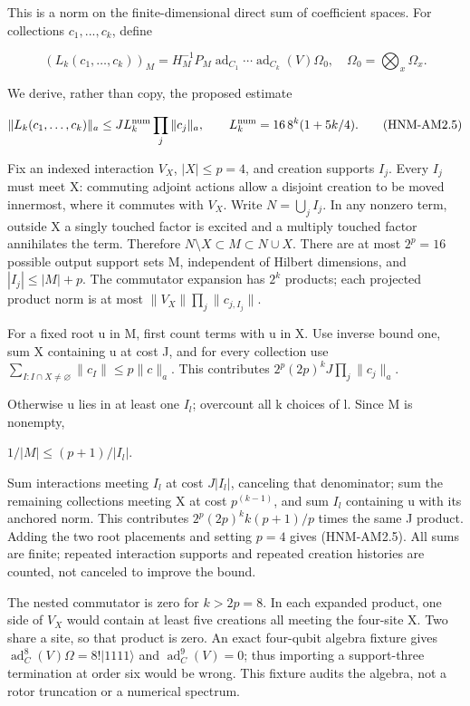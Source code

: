 This is a norm on the finite-dimensional direct sum of coefficient spaces. For collections \(c_1,...,c_k\), define

\begin{equation}
(L_k(c_1,\ldots,c_k))_M
=H_M^{-1}P_M\operatorname{ad}_{C_1}\cdots\operatorname{ad}_{C_k}(V)\Omega_0,
\quad\Omega_0=\bigotimes_x\Omega_x .
\tag{HNM-AM2.4}
\label{r29:am2:eq4}
\end{equation}

We derive, rather than copy, the proposed estimate

\begin{equation}
\|L_k(c_1,\ldots,c_k)\|_a
\le J L_k^{\rm num}\prod_j\|c_j\|_a,
\qquad L_k^{\rm num}=16\,8^k(1+5k/4).
\tag{HNM-AM2.5}
\label{r29:am2:eq5}
\end{equation}

Fix an indexed interaction \(V_X\), \(|X|\le p=4\), and creation supports \(I_j\). Every \(I_j\) must meet X: commuting adjoint actions allow a disjoint creation to be moved innermost, where it commutes with \(V_X\). Write \(N=\bigcup_j I_j\). In any nonzero term, outside X a singly touched factor is excited and a multiply touched factor annihilates the term. Therefore \(N\setminus X\subset M\subset N\cup X\). There are at most \(2^p=16\) possible output support sets M, independent of Hilbert dimensions, and \(|I_j|\le |M|+p\). The commutator expansion has \(2^k\) products; each projected product norm is at most \(\|V_X\|\prod_j\|c_{j,I_j}\|\).

For a fixed root u in M, first count terms with u in X. Use inverse bound one, sum X containing u at cost J, and for every collection use \(\sum_{I:I\cap X\ne\varnothing}\|c_I\|\le p\|c\|_a\). This contributes \(2^p(2p)^k J\prod_j\|c_j\|_a\).

Otherwise u lies in at least one \(I_l\); overcount all k choices of l. Since M is nonempty,

\(1/|M| \le  (p+1)/|I_l|\).

Sum interactions meeting \(I_l\) at cost \(J|I_l|\), canceling that denominator; sum the remaining collections meeting X at cost \(p^(k-1)\), and sum \(I_l\) containing u with its anchored norm. This contributes \(2^p(2p)^k k(p+1)/p\) times the same J product. Adding the two root placements and setting \(p=4\) gives (HNM-AM2.5). All sums are finite; repeated interaction supports and repeated creation histories are counted, not canceled to improve the bound.

The nested commutator is zero for \(k>2p=8\). In each expanded product, one side of \(V_X\) would contain at least five creations all meeting the four-site X. Two share a site, so that product is zero. An exact four-qubit algebra fixture gives \(\operatorname{ad}_C^8(V)\Omega=8!|1111\rangle\) and \(\operatorname{ad}_C^9(V)=0\); thus importing a support-three termination at order six would be wrong. This fixture audits the algebra, not a rotor truncation or a numerical spectrum.

